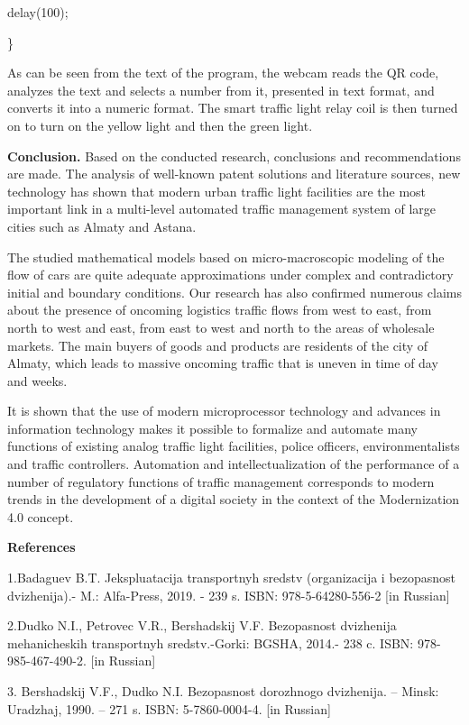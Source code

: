 delay(100);

\}

As can be seen from the text of the program, the webcam reads the QR
code, analyzes the text and selects a number from it, presented in text
format, and converts it into a numeric format. The smart traffic light
relay coil is then turned on to turn on the yellow light and then the
green light.

\textbf{Conclusion.} Based on the conducted research, conclusions and
recommendations are made. The analysis of well-known patent solutions
and literature sources, new technology has shown that modern urban
traffic light facilities are the most important link in a multi-level
automated traffic management system of large cities such as Almaty and
Astana.

The studied mathematical models based on micro-macroscopic modeling of
the flow of cars are quite adequate approximations under complex and
contradictory initial and boundary conditions. Our research has also
confirmed numerous claims about the presence of oncoming logistics
traffic flows from west to east, from north to west and east, from east
to west and north to the areas of wholesale markets. The main buyers of
goods and products are residents of the city of Almaty, which leads to
massive oncoming traffic that is uneven in time of day and weeks.

It is shown that the use of modern microprocessor technology and
advances in information technology makes it possible to formalize and
automate many functions of existing analog traffic light facilities,
police officers, environmentalists and traffic controllers. Automation
and intellectualization of the performance of a number of regulatory
functions of traffic management corresponds to modern trends in the
development of a digital society in the context of the Modernization 4.0
concept.

\textbf{References}

1.Badaguev B.T. Jekspluatacija transportnyh sredstv (organizacija i
bezopasnost\textquotesingle{} dvizhenija).- M.:
Al\textquotesingle fa-Press, 2019. - 239 s. ISBN: 978-5-64280-556-2
{[}in Russian{]}

2.Dudko N.I., Petrovec V.R., Bershadskij V.F.
Bezopasnost\textquotesingle{} dvizhenija mehanicheskih transportnyh
sredstv.-Gorki: BGSHA, 2014.- 238 c. ISBN: 978-985-467-490-2. {[}in
Russian{]}

3. Bershadskij V.F., Dudko N.I. Bezopasnost\textquotesingle{} dorozhnogo
dvizhenija. -- Minsk: Uradzhaj, 1990. -- 271 s. ISBN: 5-7860-0004-4.
{[}in Russian{]}

